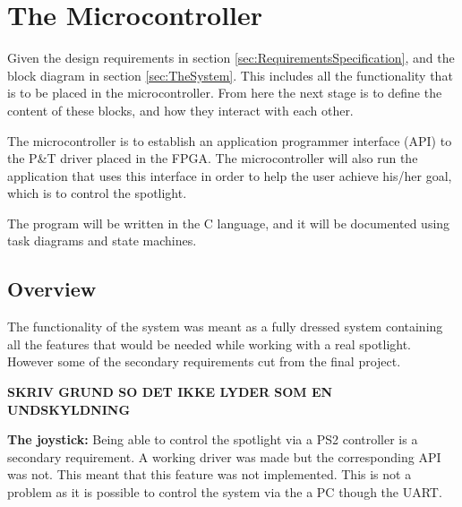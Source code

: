 \section{The Microcontroller}
\label{sec:TheMicrocontroller}

 Given the design requirements in section \ref{sec:RequirementsSpecification}, and the block diagram in section \ref{sec:TheSystem}. This includes all the functionality that is to be placed in the microcontroller. From here the next stage is to define the content of these blocks, and how they interact with each other. 
 
 The microcontroller is to establish an application programmer interface (API) to the P\&T driver placed in the FPGA. The microcontroller will also run the application that uses this interface in order to help the user achieve his/her goal, which is to control the spotlight.
 
 The program will be written in the C language, and it will be documented using task diagrams and state machines. 
















\subsection{Overview}

The functionality of the system was meant as a fully dressed system containing all the features that would be needed while working with a real spotlight. However some of the secondary requirements cut from the final project.

\textbf{SKRIV GRUND SO DET IKKE LYDER SOM EN UNDSKYLDNING}


\textbf{The joystick:} Being able to control the spotlight via a PS2 controller is a secondary requirement. A working driver was made but the corresponding API was not. This meant that this feature was not implemented. This is not a problem as it is possible to control the system via the a PC though the UART.


